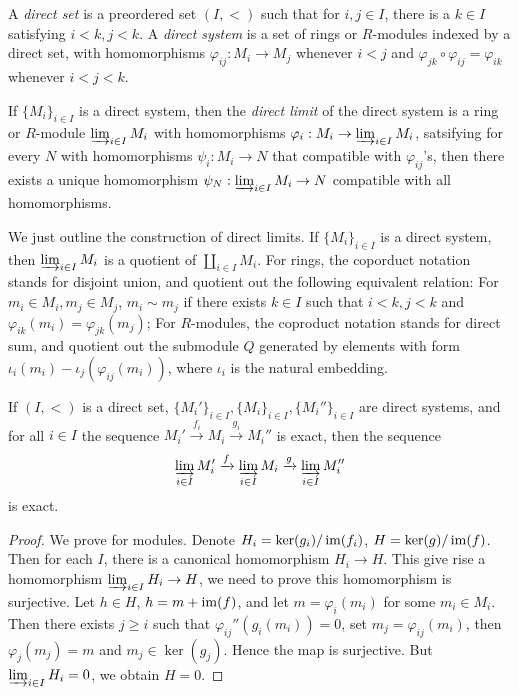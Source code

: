 \begin{defn}
    A \emph{direct set} is a preordered set $(I,<)$ such that for $i,j\in I$, there is a $k\in I$ satisfying $i<k,j<k$.
    A \emph{direct system} is a set of rings or $R$-modules indexed by a direct set, with homomorphisms $\varphi_{ij}:M_i\to M_j$ whenever $i<j$ and $\varphi_{jk}\circ\varphi_{ij}=\varphi_{ik}$ whenever $i<j<k$.

    If $\{M_i\}_{i\in I}$ is a direct system, then the \emph{direct limit} of the direct system is a ring or $R$-module $\varinjlim_{i\in I}M_i$ with homomorphisms $\varphi_i:M_i\to\varinjlim_{i\in I}M_i$, satsifying for every $N$ with homomorphisms $\psi_i:M_i\to N$ that compatible with $\varphi_{ij}$'s, then there exists a unique homomorphism $\psi_N:\varinjlim_{i\in I}M_i\to N$ compatible with all homomorphisms.
\end{defn}

We just outline the construction of direct limits.
If $\{M_i\}_{i\in I}$ is a direct system, then $\varinjlim_{i\in I}M_i$ is a quotient of $\coprod_{i\in I}M_i$.
For rings, the coporduct notation stands for disjoint union, and quotient out the following equivalent relation: For $m_i\in M_i,m_j\in M_j$, $m_i\sim m_j$ if there exists $k\in I$ such that $i<k,j<k$ and $\varphi_{ik}(m_i)=\varphi_{jk}(m_j)$;
For $R$-modules, the coproduct notation stands for direct sum, and quotient out the submodule $Q$ generated by elements with form $\iota_i(m_i)-\iota_j(\varphi_{ij}(m_i))$, where $\iota_i$ is the natural embedding. 

\begin{prop}
    If $(I,<)$ is a direct set, $\{M_i'\}_{i\in I},\{M_i\}_{i\in I},\{M_i''\}_{i\in I}$ are direct systems, and for all $i\in I$ the sequence $M_i'\xrightarrow{f_i}M_i\xrightarrow{g_i}M_i''$ is exact, then the sequence
    \[\varinjlim_{i\in I}M_i'\xrightarrow{f}\varinjlim_{i\in I}M_i\xrightarrow{g}\varinjlim_{i\in I}M_i''\]
    is exact.
\end{prop}
\begin{proof}
    We prove for modules.
    Denote $H_i=\ker(g_i)/\operatorname{im}(f_i)$, $H=\ker(g)/\operatorname{im}(f)$.
    Then for each $I$, there is a canonical homomorphism $H_i\to H$.
    This give rise a homomorphism $\varinjlim_{i\in I}H_i\to H$, we need to prove this homomorphism is surjective.
    Let $h\in H$, $h=m+\operatorname{im}(f)$, and let $m=\varphi_i(m_i)$ for some $m_i\in M_i$.
    Then there exists $j\geq i$ such that $\varphi_{ij}''(g_i(m_i))=0$, set $m_j=\varphi_{ij}(m_i)$, then $\varphi_j(m_j)=m$ and $m_j\in\ker(g_j)$.
    Hence the map is surjective.
    But $\varinjlim_{i\in I}H_i=0$, we obtain $H=0$.
\end{proof}

